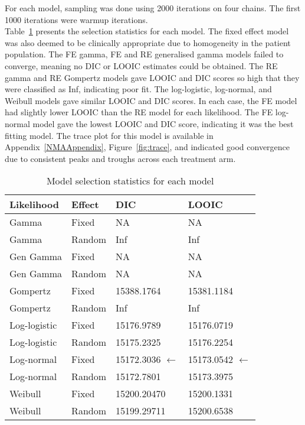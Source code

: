 For each model, sampling was done using 2000 iterations on four chains. The first 1000 iterations were warmup iterations. \\

Table~\ref{tab:selectionstat} presents the selection statistics for each model. The fixed effect model was also deemed to be clinically appropriate due to homogeneity in the patient population. The FE gamma, FE and RE generalised gamma models failed to converge, meaning no DIC or LOOIC estimates could be obtained. The RE gamma and RE Gompertz models gave LOOIC and DIC scores so high that they were classified as Inf, indicating poor fit. The log-logistic, log-normal, and Weibull models gave similar LOOIC and DIC scores. In each case, the FE model had slightly lower LOOIC than the RE model for each likelihood. The FE log-normal model gave the lowest LOOIC and DIC score, indicating it was the best fitting model. The trace plot for this model is available in Appendix~\ref{NMAAppendix}, Figure~\ref{fig:trace}, and indicated good convergence due to consistent peaks and troughs across each treatment arm. \\

\begin{table}[h]
    \centering
    \begin{tabular}{llll}
    \hline
    Likelihood   & Effect & DIC         & LOOIC      \\ \hline
    Gamma        & Fixed  & NA          & NA         \\
    Gamma        & Random & Inf         & Inf        \\
    Gen Gamma    & Fixed  & NA          & NA         \\
    Gen Gamma    & Random & NA          & NA         \\
    Gompertz     & Fixed  & 15388.1764  & 15381.1184 \\
    Gompertz     & Random & Inf         & Inf        \\
    Log-logistic & Fixed  & 15176.9789  & 15176.0719 \\
    Log-logistic & Random & 15175.2325  & 15176.2254 \\
    Log-normal   & Fixed  & 15172.3036 $\leftarrow$ & 15173.0542 $\leftarrow$ \\
    Log-normal   & Random & 15172.7801  & 15173.3975 \\
    Weibull      & Fixed  & 15200.20470 & 15200.1331 \\
    Weibull      & Random & 15199.29711 & 15200.6538 \\ \hline
    \end{tabular}
    \caption{Model selection statistics for each model}
    \label{tab:selectionstat}
\end{table}

